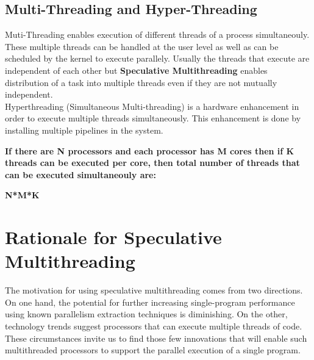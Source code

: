 \documentclass[a4paper,12pt]{article}
\begin{document}
\subsection{Multi-Threading and Hyper-Threading}
Muti-Threading enables execution of different threads of a process simultaneouly. These multiple threads can be handled at the user level as well as can be scheduled by the kernel to execute parallely. Usually the threads that execute are independent of each other but \textbf{Speculative Multithreading} enables distribution of a task into multiple threads even if they are not mutually independent.
\\
Hyperthreading (Simultaneous Multi-threading) is a hardware enhancement in order to execute multiple threads simultaneously. This enhancement is done by installing multiple pipelines in the system.
\\
\begin{minipage}{\textwidth}
\textbf{If there are N processors and each processor has M cores then if K threads can be executed per core, then total number of threads that can be executed simultaneouly are:}
\begin{center}
 \Large \textbf{N*M*K}
\end{center}
\end{minipage}
\section{Rationale for Speculative Multithreading}
The motivation for using speculative multithreading comes from two directions. On one hand, the potential for further increasing single-program performance using known parallelism extraction techniques is diminishing. On the other, technology trends suggest processors that can execute multiple threads of code. These circumstances invite us to find those few innovations that will enable such multithreaded processors to support the parallel execution of a single program.\cite{speculative}
\end{document}

